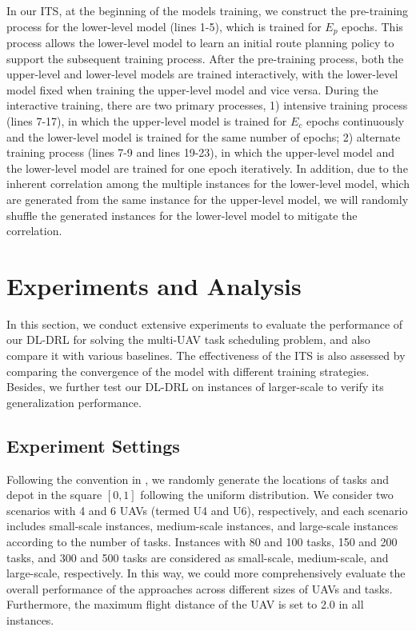 \documentclass[lettersize,journal]{IEEEtran}
\begin{document}
	In our ITS, at the beginning of the models training, we construct the pre-training process for the lower-level model (lines 1-5), which is trained for ${{E}_{p}}$ epochs. This process allows the lower-level model to learn an initial route planning policy to support the subsequent training process. After the pre-training process, both the upper-level and lower-level models are trained interactively, with the lower-level model fixed when training the upper-level model and vice versa. During the interactive training, there are two primary processes, 1) intensive training process (lines 7-17), in which the upper-level model is trained for ${{E}_{c}}$ epochs continuously and the lower-level model is trained for the same number of epochs; 2) alternate training process (lines 7-9 and lines 19-23), in which the upper-level model and the lower-level model are trained for one epoch iteratively. In addition, due to the inherent correlation among the multiple instances for the lower-level model, which are generated from the same instance for the upper-level model, we will randomly shuffle the generated instances for the lower-level model to mitigate the correlation.
	
	\section{Experiments and Analysis}
	
	In this section, we conduct extensive experiments to evaluate the performance of our DL-DRL for solving the multi-UAV task scheduling problem, and also compare it with various baselines. The effectiveness of the ITS is also assessed by comparing the convergence of the model with different training strategies. Besides, we further test our DL-DRL on instances of larger-scale to verify its generalization performance.
	
	
	\subsection{Experiment Settings}
	
	Following the convention in \cite{koolATTENTIONLEARNSOLVE2019a, liDeepReinforcementLearning2021c, nazariReinforcementLearningSolving2018c}, we randomly generate the locations of tasks and depot in the square $\left[ 0,1 \right]$ following the uniform distribution. We consider two scenarios with 4 and 6 UAVs (termed U4 and U6), respectively, and each scenario includes small-scale instances, medium-scale instances, and large-scale instances according to the number of tasks. Instances with 80 and 100 tasks, 150 and 200 tasks, and 300 and 500 tasks are considered as small-scale, medium-scale, and large-scale, respectively. In this way, we could more comprehensively evaluate the overall performance of the approaches across different sizes of UAVs and tasks. Furthermore, the maximum flight distance of the UAV is set to 2.0 in all instances.
	
\end{document}
